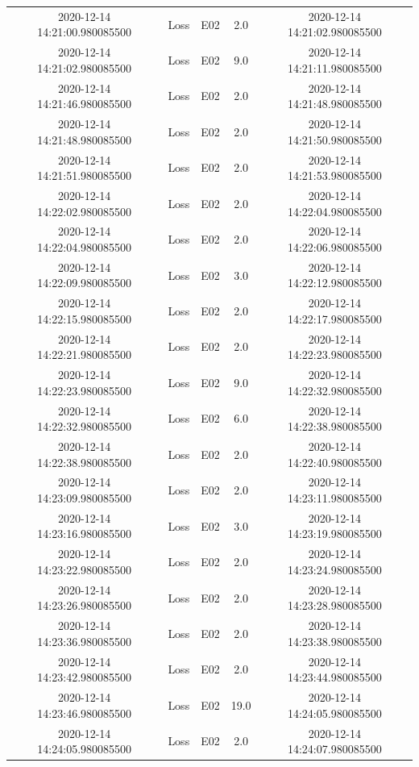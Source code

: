 \begin{enumerate}
\begin{longtabu}{ccccc}
2020{-}12{-}14 14:21:00.980085500&Loss&E02&2.0&2020{-}12{-}14 14:21:02.980085500\\%
2020{-}12{-}14 14:21:02.980085500&Loss&E02&9.0&2020{-}12{-}14 14:21:11.980085500\\%
2020{-}12{-}14 14:21:46.980085500&Loss&E02&2.0&2020{-}12{-}14 14:21:48.980085500\\%
2020{-}12{-}14 14:21:48.980085500&Loss&E02&2.0&2020{-}12{-}14 14:21:50.980085500\\%
2020{-}12{-}14 14:21:51.980085500&Loss&E02&2.0&2020{-}12{-}14 14:21:53.980085500\\%
2020{-}12{-}14 14:22:02.980085500&Loss&E02&2.0&2020{-}12{-}14 14:22:04.980085500\\%
2020{-}12{-}14 14:22:04.980085500&Loss&E02&2.0&2020{-}12{-}14 14:22:06.980085500\\%
2020{-}12{-}14 14:22:09.980085500&Loss&E02&3.0&2020{-}12{-}14 14:22:12.980085500\\%
2020{-}12{-}14 14:22:15.980085500&Loss&E02&2.0&2020{-}12{-}14 14:22:17.980085500\\%
2020{-}12{-}14 14:22:21.980085500&Loss&E02&2.0&2020{-}12{-}14 14:22:23.980085500\\%
2020{-}12{-}14 14:22:23.980085500&Loss&E02&9.0&2020{-}12{-}14 14:22:32.980085500\\%
2020{-}12{-}14 14:22:32.980085500&Loss&E02&6.0&2020{-}12{-}14 14:22:38.980085500\\%
2020{-}12{-}14 14:22:38.980085500&Loss&E02&2.0&2020{-}12{-}14 14:22:40.980085500\\%
2020{-}12{-}14 14:23:09.980085500&Loss&E02&2.0&2020{-}12{-}14 14:23:11.980085500\\%
2020{-}12{-}14 14:23:16.980085500&Loss&E02&3.0&2020{-}12{-}14 14:23:19.980085500\\%
2020{-}12{-}14 14:23:22.980085500&Loss&E02&2.0&2020{-}12{-}14 14:23:24.980085500\\%
2020{-}12{-}14 14:23:26.980085500&Loss&E02&2.0&2020{-}12{-}14 14:23:28.980085500\\%
2020{-}12{-}14 14:23:36.980085500&Loss&E02&2.0&2020{-}12{-}14 14:23:38.980085500\\%
2020{-}12{-}14 14:23:42.980085500&Loss&E02&2.0&2020{-}12{-}14 14:23:44.980085500\\%
2020{-}12{-}14 14:23:46.980085500&Loss&E02&19.0&2020{-}12{-}14 14:24:05.980085500\\%
2020{-}12{-}14 14:24:05.980085500&Loss&E02&2.0&2020{-}12{-}14 14:24:07.980085500\\%

\end{longtabu}
\end{enumerate}
